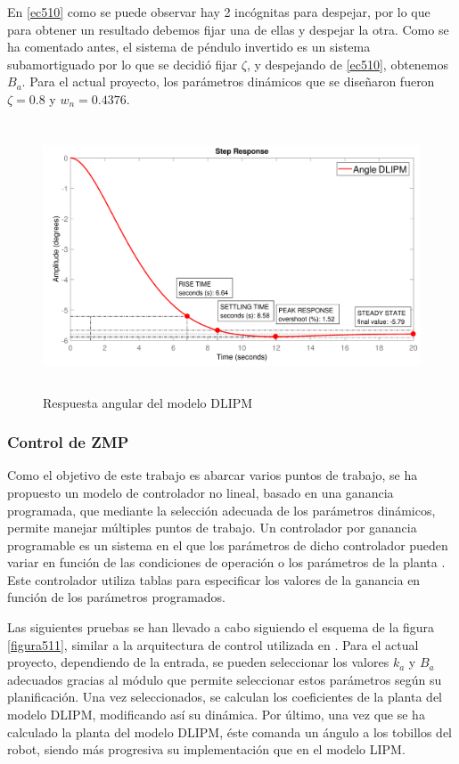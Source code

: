 \begin{itemize}
En \ref{ec510} como se puede observar hay 2 incógnitas para despejar, por lo que para obtener un resultado debemos fijar una de ellas y despejar la otra. Como se ha comentado antes, el sistema de péndulo invertido es un sistema subamortiguado por lo que se decidió fijar $\zeta$, y despejando de \ref{ec510}, obtenemos $B_a$. Para el actual proyecto, los parámetros dinámicos que se diseñaron fueron $\zeta = 0.8$ y $w_n = 0.4376$.

\begin{figure}[H]
\centering
\includegraphics[width=13cm, height=8cm]{imagenes/apartado_5/59_step_response}
\caption{Respuesta angular del modelo DLIPM}
\label{figura510}
\end{figure}

\end{itemize}


\subsubsection{Control de ZMP}

Como el objetivo de este trabajo es abarcar varios puntos de trabajo, se ha propuesto un modelo de controlador no lineal, basado en una ganancia programada, que mediante la selección adecuada de los parámetros dinámicos, permite manejar múltiples puntos de trabajo. Un controlador por ganancia programable es un sistema en el que los parámetros de dicho controlador pueden variar en función de las condiciones de operación o los parámetros de la planta \cite{ref22}. Este controlador utiliza tablas para especificar los valores de la ganancia en función de los parámetros programados.

Las siguientes pruebas se han llevado a cabo siguiendo el esquema de la figura \ref{figura511}, similar a la arquitectura de control utilizada en \cite{ref21}. Para el actual proyecto, dependiendo de la entrada, se pueden seleccionar los valores $k_a$ y $B_a$ adecuados gracias al módulo que permite seleccionar estos parámetros según su planificación. Una vez seleccionados, se calculan los coeficientes de la planta del modelo DLIPM, modificando así su dinámica. Por último, una vez que se ha calculado la planta del modelo DLIPM, éste comanda un ángulo a los tobillos del robot, siendo más progresiva su implementación que en el modelo LIPM.

